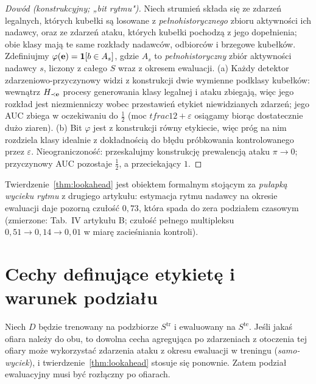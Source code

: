 \begin{proof}[Dowód (konstrukcyjny; „bit rytmu")]
Niech strumień składa się ze zdarzeń legalnych, których kubełki są
losowane z \emph{pełnohistorycznego} zbioru aktywności ich nadawcy,
oraz ze zdarzeń ataku, których kubełki pochodzą z jego dopełnienia; obie
klasy mają te same rozkłady nadawców, odbiorców i brzegowe kubełków.
Zdefiniujmy $\varphi(\mathbf{e})=\mathbf{1}[b \in A_s]$, gdzie $A_s$ to
\emph{pełnohistoryczny} zbiór aktywności nadawcy $s$, liczony z
całego $S$ wraz z okresem ewaluacji.
(a) Każdy detektor zdarzeniowo-przyczynowy widzi z konstrukcji dwie
wymienne podklasy kubełków: wewnątrz $H_{\prec\mathbf{e}}$ procesy
generowania klasy legalnej i ataku zbiegają, więc jego rozkład jest
niezmienniczy wobec przestawień etykiet niewidzianych zdarzeń; jego AUC
zbiega w oczekiwaniu do $\tfrac12$ (moc $tfrac12+\varepsilon$ osiągamy
biorąc dostatecznie dużo ziaren).
(b) Bit $\varphi$ jest z konstrukcji równy etykiecie, więc próg na nim
rozdziela klasy idealnie z dokładnością do błędu próbkowania
kontrolowanego przez $\varepsilon$.
Nieograniczoność: przeskalujmy konstrukcję prewalencją ataku
$\pi\to0$; przyczynowy AUC pozostaje $\tfrac12$, a przeciekający $1$.
\end{proof}

\begin{remark}
Twierdzenie~\ref{thm:lookahead} jest obiektem formalnym stojącym za
\emph{pułapką wycieku rytmu} z drugiego artykułu: estymacja rytmu
nadawcy na okresie ewaluacji daje pozorną czułość $0{,}73$, która
spada do zera podziałem czasowym (zmierzone: Tab.~IV artykułu B;
czułość pełnego multipleksu $0{,}51\to0{,}14\to0{,}01$ w miarę
zacieśniania kontroli).
\end{remark}

\chapter{Cechy definujące etykietę i warunek podziału}
\label{sec:split}

\begin{proposition}
\label{prop:split}
Niech $D$ będzie trenowany na podzbiorze $S^{\mathrm{tr}}$ i
ewaluowany na $S^{\mathrm{te}}$. Jeśli jakaś ofiara należy do obu, to
dowolna cecha agregująca po zdarzeniach z otoczenia tej ofiary może
wykorzystać zdarzenia ataku z okresu ewaluacji w treningu
(\emph{samo-wyciek}), i twierdzenie~\ref{thm:lookahead} stosuje się
ponownie. Zatem podział ewaluacyjny musi być rozłączny po ofiarach.
\end{proposition}

